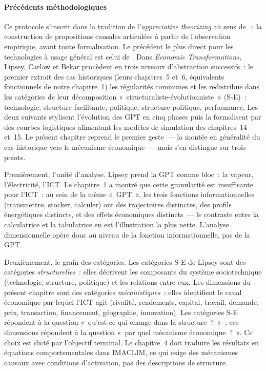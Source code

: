 \paragraph{Précédents méthodologiques} Ce protocole s'inscrit dans la tradition de l'\emph{appreciative theorizing} au sens de \textcite{nelson_winter_1982}~: la construction de propositions causales articulées à partir de l'observation empirique, avant toute formalisation. Le précédent le plus direct pour les technologies à usage général est celui de \textcite{lipsey_economic_2005}. Dans \emph{Economic Transformations}, Lipsey, Carlaw et Bekar procèdent en trois niveaux d'abstraction successifs~: le premier extrait des cas historiques (leurs chapitres~5 et~6, équivalents fonctionnels de notre chapitre~1) les régularités communes et les redistribue dans les catégories de leur décomposition «~structuraliste-évolutionniste~» (S-E)~: technologie, structure facilitante, politique, structure politique, performance. Les deux suivants stylisent l'évolution des GPT en cinq phases puis la formalisent par des courbes logistiques alimentant les modèles de simulation des chapitres~14 et~15. Le présent chapitre reprend le premier geste~--- la montée en généralité du cas historique vers le mécanisme économique~--- mais s'en distingue sur trois points.

Premièrement, l'unité d'analyse. Lipsey prend la GPT comme bloc~: la vapeur, l'électricité, l'ICT. Le chapitre~1 a montré que cette granularité est insuffisante pour l'ICT~: au sein de la même «~GPT~», les trois fonctions informationnelles (transmettre, stocker, calculer) ont des trajectoires distinctes, des profils énergétiques distincts, et des effets économiques distincts~--- le contraste entre la calculatrice et la tabulatrice en est l'illustration la plus nette. L'analyse dimensionnelle opère donc au niveau de la fonction informationnelle, pas de la GPT.

Deuxièmement, le grain des catégories. Les catégories S-E de Lipsey sont des catégories \emph{structurelles}~: elles décrivent les composants du système sociotechnique (technologie, structure, politique) et les relations entre eux. Les dimensions du présent chapitre sont des catégories \emph{mécanistiques}~: elles identifient le canal économique par lequel l'ICT agit (rivalité, rendements, capital, travail, demande, prix, transaction, financement, géographie, innovation). Les catégories S-E répondent à la question «~qu'est-ce qui change dans la structure~?~»~; ces dimensions répondent à la question «~par quel mécanisme économique~?~». Ce choix est dicté par l'objectif terminal. Le chapitre~4 doit traduire les résultats en équations comportementales dans IMACLIM, ce qui exige des mécanismes causaux avec conditions d'activation, pas des descriptions de structure.

